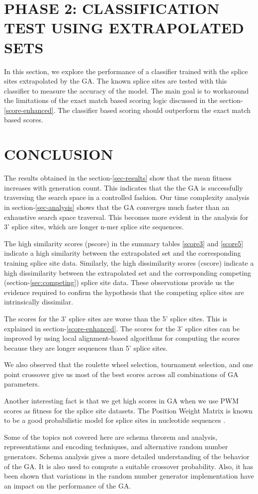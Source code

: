 \documentclass[12pt,a4paper]{article}
\begin{document}
	\section{PHASE 2: CLASSIFICATION TEST USING EXTRAPOLATED SETS}
	
	In this section, we explore the performance of a classifier trained with the splice sites extrapolated by the GA. The known splice sites are tested with this classifier to measure the accuracy of the model. The main goal is to workaround the limitations of the exact match based scoring logic discussed in the section-\ref{score-enhanced}. The classifier based scoring should outperform the exact match based scores.
	
	

	\section{CONCLUSION}
	The results obtained in the section-\ref{sec-results} show that the mean fitness increases with generation count. This indicates that the the GA is successfully traversing the search space in a controlled fashion. Our time complexity analysis in section-\ref{sec-analysis} shows that the GA converges much faster than an exhaustive search space traversal. This becomes more evident in the analysis for 3' splice sites, which are longer n-mer splice site sequences. \par 
	The high similarity scores (pscore) in the summary tables \ref{score3} and \ref{score5} indicate a high similarity between the extrapolated set and the corresponding training splice site data. Similarly, the high dissimilarity scores (cscore) indicate a high dissimilarity between the extrapolated set and the corresponding competing (section-\ref{sec:competing}) splice site data. These observations provide us the evidence required to confirm the hypothesis that the competing splice sites are intrinsically dissimilar.\par
	The scores for the 3' splice sites are worse than the 5' splice sites. This is explained in section-\ref{score-enhanced}. The scores for the 3' splice sites can be improved by using local alignment-based algorithms for computing the scores because they are longer sequences than 5' splice sites. \par
	We also observed that the roulette wheel selection, tournament selection, and one point crossover give us most of the best scores across all combinations of GA parameters. \par
	Another interesting fact is that we get high scores in GA when we use PWM scores as fitness for the splice site datasets. The Position Weight Matrix is known to be a good probabilistic model for splice sites in nucleotide sequences \cite{pwm-2}. \par
	Some of the topics not covered here are schema theorem and analysis, representations and encoding techniques, and alternative random number generators. Schema analysis gives a more detailed understanding of the behavior of the GA. It is also used to compute a suitable crossover probability. Also, it has been shown that variations in the random number generator implementation have an impact on the performance of the GA. 
	
\end{document}
